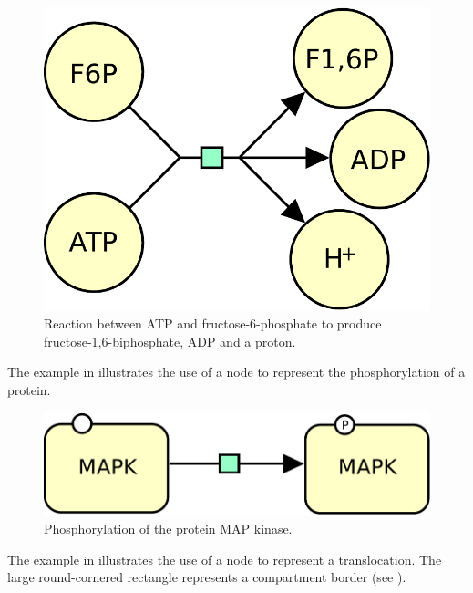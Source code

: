 \begin{figure}[H]
  \centering
  \includegraphics[scale = 0.5]{images/process-reaction}
  \caption{Reaction between ATP and fructose-6-phosphate to produce fructose-1,6-biphosphate, ADP and a proton.}
  \label{fig:trans-react}
\end{figure}

The example in  illustrates the use of a  node to represent the phosphorylation of a protein. 

\begin{figure}[H]
  \centering
  \includegraphics[scale = 0.5]{images/process-phosphorylation}
  \caption{Phosphorylation of the protein MAP kinase.}
  \label{fig:trans-phos}
\end{figure}


The example in  illustrates the use of a  node to represent a translocation. The large round-cornered rectangle represents a compartment border (see ).

